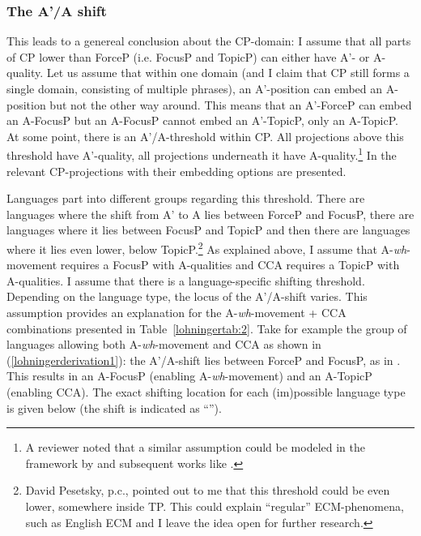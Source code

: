 \documentclass[output=paper,colorlinks,citecolor=brown]{langscibook}
\begin{document}
\subsubsection{The A'/A shift} 
This leads to a genereal conclusion about the CP-domain: I assume that all parts of CP lower than ForceP (i.e. FocusP and TopicP) can either have A'- or A-quality. Let us assume that within one domain (and I claim that CP still forms a single domain, consisting of multiple phrases), an A'-position can embed an A-position but not the other way around.  This means that an A'-ForceP can embed an A-FocusP but an A-FocusP cannot embed an A'-TopicP, only an A-TopicP. At some point, there is an A'/A-threshold within CP. All projections above this threshold have A'-quality, all projections underneath it have A-quality.\footnote{A reviewer noted that a similar assumption could be modeled in the framework by \citet{williams2002representation} and subsequent works like \citet{keine2018not}.} In  the relevant CP-projections with their embedding options are presented.

Languages part into different groups regarding this threshold. There are languages where the shift from A' to A lies between ForceP and FocusP, there are languages where it lies between FocusP and TopicP and then there are languages where it lies even lower, below TopicP.\footnote{David Pesetsky, p.c., pointed out to me that this threshold could be even lower, somewhere inside TP. This could explain “regular” ECM-phenomena, such as English ECM and I leave the idea open for further research.} As explained above, I assume that A-\textit{wh}-movement requires a FocusP with A-qualities and CCA requires a TopicP with A-qualities. I assume that there is a language-specific shifting threshold. Depending on the language type, the locus of the A'/A-shift varies. This assumption provides an explanation for the A-\textit{wh}-movement + CCA combinations presented in Table~\ref{lohningertab:2}. Take for example the group of languages allowing both A-\textit{wh}-movement and CCA as shown in (\ref{lohningerderivation1}): the A'/A-shift lies between ForceP and FocusP, as in . This results in an A-FocusP (enabling A-\textit{wh}-movement) and an A-TopicP (enabling CCA). The exact shifting location for each (im)possible language type is given below (the shift is indicated as “\rightarrow”).
\end{document}
